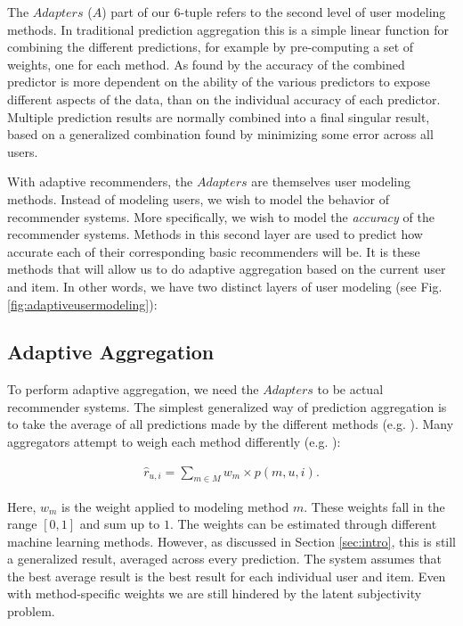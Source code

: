 The $Adapters$ ($A$) part of our 6-tuple refers to the second level of user modeling methods.
In traditional prediction aggregation this is a simple linear function for combining the different predictions,
for example by pre-computing a set of weights, one for each method.
As found by \cite[p.6]{Bell2007} the accuracy of the combined predictor is more dependent on the 
ability of the various predictors to expose different aspects of the data, than on 
the individual accuracy of each predictor.
Multiple prediction results are normally combined into a final singular result,
based on a generalized combination found by minimizing some error across all users.

With adaptive recommenders, the $Adapters$ are themselves user modeling methods.
Instead of modeling users, we wish to model the behavior of recommender systems.
More specifically, we wish to model the \emph{accuracy} of the recommender systems.
Methods in this second layer are used to predict how accurate each of their corresponding basic recommenders will be.
It is these methods that will allow us to do adaptive aggregation based on the current user and item.
In other words, we have two distinct layers of user modeling 
(see Fig. \ref{fig:adaptiveusermodeling}):



\subsection{Adaptive Aggregation}

To perform adaptive aggregation, we need the $Adapters$ to be actual recommender systems.
The simplest generalized way of prediction aggregation is to take the average of all predictions made
by the different methods (e.g. \cite[p.3]{Aslam2001}).
Many aggregators attempt to weigh each method differently (e.g. \cite{Claypool1999}):

\begin{eqnarray}
  \hat{r}_{u,i} = \sum_{m \in M} w_{m} \times p(m,u,i).
\end{eqnarray}

Here, $w_m$ is the weight applied to modeling method $m$. 
These weights fall in the range $[0,1]$ and sum up to $1$.
The weights can be estimated through different machine learning methods.
However, as discussed in Section \ref{sec:intro},
this is still a generalized result, averaged across every prediction.
The system assumes that the best average result is the best result for each individual user and item.
Even with method-specific weights we are still hindered by the latent subjectivity problem.

